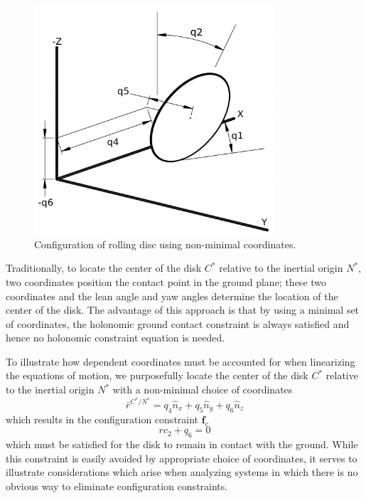 \documentclass[smallcondensed,final]{svjour3}                     %
\begin{document}
\begin{figure}[!htb]
    \centering
    \includegraphics[width=0.8\textwidth]{disk_drawing_cropped.pdf}
    \caption{Configuration of rolling disc using non-minimal coordinates.}
    \label{fig:rolling_disc}
\end{figure}

Traditionally, to locate the center of the disk $C^*$ relative to the inertial
origin $N^*$, two coordinates position the contact point in the ground plane;
these two coordinates and the lean angle and yaw angles determine the location
of the center of the disk. The advantage of this approach is that by using a
minimal set of coordinates, the holonomic ground contact constraint is always
satisfied and hence no holonomic constraint equation is needed.

To illustrate how dependent coordinates must be
accounted for when linearizing the equations of motion, we purposefully locate
the center of the disk $C^*$ relative to the inertial origin $N^*$ with a
non-minimal choice of coordinates
\begin{equation*}
  \bar{r}^{C^*/N^*} = q_4 \hat{n}_x + q_5 \hat{n}_y + q_6 \hat{n}_z
\end{equation*}
which results in the configuration constraint $\mathbf{f}_c$
\begin{equation}
  \label{rd:f_c}
  rc_2 + q_6 = 0
\end{equation}
which must be satisfied for the disk to remain in contact with the ground.
While this constraint is easily avoided by appropriate choice of coordinates,
it serves to illustrate considerations which arise when analyzing systems in
which there is no obvious way to eliminate configuration constraints.
\end{document}

